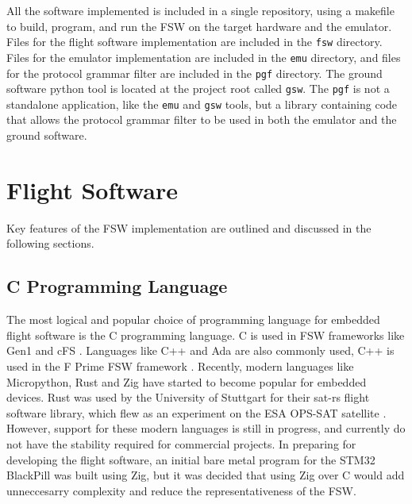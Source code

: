 \documentclass[../report.tex]{subfiles}
\begin{document}



All the software implemented is included in a single repository, using a
makefile to build, program, and run the FSW on the target hardware and the
emulator. Files for the flight software implementation are included in the
\lstinline|fsw| directory. Files for the emulator implementation are included
in the \lstinline|emu| directory, and files for the protocol grammar filter
are included in the \lstinline|pgf| directory. The ground software python tool
is located at the project root called \lstinline|gsw|. The \lstinline|pgf| is
not a standalone application, like the \lstinline|emu| and \lstinline|gsw|
tools, but a library containing code that allows the protocol grammar filter to
be used in both the emulator and the ground software.

\section{Flight Software}

Key features of the FSW implementation are outlined and discussed in the
following sections.

\subsection{C Programming Language} %

The most logical and popular choice of programming language for embedded flight
software is the C programming language. C is used in FSW frameworks like Gen1
and cFS \citep{Bal_FSDK, Nasa_cFS}. Languages like C++ and Ada are also
commonly used, C++ is used in the F Prime FSW framework \citep{Nasa_fprime}.
Recently, modern languages like Micropython, Rust and Zig have started to
become popular for embedded devices. Rust was used by the University of
Stuttgart for their sat-rs flight software library, which flew as an experiment
on the ESA OPS-SAT satellite \citep{satrs, opsat}. However, support for these
modern languages is still in progress, and currently do not have the stability
required for commercial projects. In preparing for developing the flight
software, an initial bare metal program for the STM32 BlackPill was built using
Zig, but it was decided that using Zig over C would add unneccesarry complexity
and reduce the representativeness of the FSW.
\end{document}
